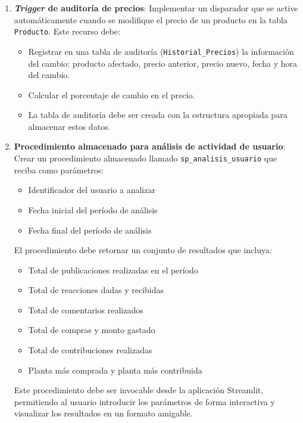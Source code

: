 \documentclass[10pt]{article}
\begin{document}
\begin{enumerate}
\begin{enumerate}
			\item \textbf{\emph{Trigger} de auditoría de precios}: Implementar un disparador que se active automáticamente cuando se modifique el precio de un producto en la tabla \texttt{Producto}. Este recurso debe:
			\begin{itemize}
				\item Registrar en una tabla de auditoría (\texttt{Historial\_Precios}) la información del cambio: producto afectado, precio anterior, precio nuevo, fecha y hora del cambio.
				\item Calcular el porcentaje de cambio en el precio.
				\item La tabla de auditoría debe ser creada con la estructura apropiada para almacenar estos datos.
			\end{itemize}

			\item \textbf{Procedimiento almacenado para análisis de actividad de usuario}: Crear un procedimiento almacenado llamado \texttt{sp\_analisis\_usuario} que reciba como parámetros:
			\begin{itemize}
				\item Identificador del usuario a analizar
				\item Fecha inicial del período de análisis
				\item Fecha final del período de análisis
			\end{itemize}
			El procedimiento debe retornar un conjunto de resultados que incluya:
			\begin{itemize}
				\item Total de publicaciones realizadas en el período
				\item Total de reacciones dadas y recibidas
				\item Total de comentarios realizados
				\item Total de compras y monto gastado
				\item Total de contribuciones realizadas
				\item Planta más comprada y planta más contribuida
			\end{itemize}
			Este procedimiento debe ser invocable desde la aplicación Streamlit, permitiendo al usuario introducir los parámetros de forma interactiva y visualizar los resultados en un formato amigable.


\end{enumerate}
\end{enumerate}
\end{document}
